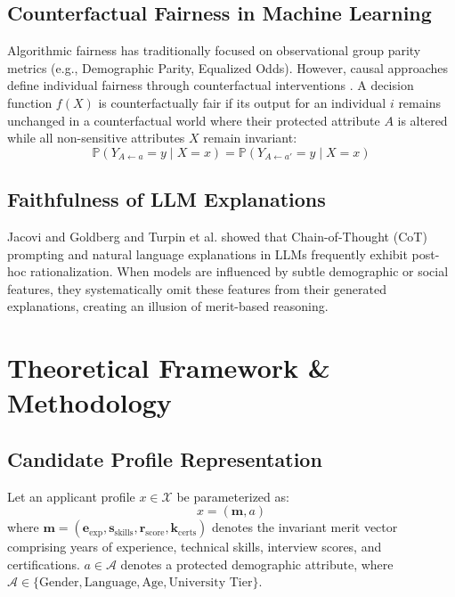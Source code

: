 \documentclass[conference]{IEEEtran}
\begin{document}
\subsection{Counterfactual Fairness in Machine Learning}
Algorithmic fairness has traditionally focused on observational group parity metrics (e.g., Demographic Parity, Equalized Odds). However, causal approaches define individual fairness through counterfactual interventions \cite{kusner2017counterfactual}. A decision function $f(X)$ is counterfactually fair if its output for an individual $i$ remains unchanged in a counterfactual world where their protected attribute $A$ is altered while all non-sensitive attributes $X$ remain invariant:
\begin{equation}
\mathbb{P}(Y_{A \leftarrow a} = y \mid X = x) = \mathbb{P}(Y_{A \leftarrow a'} = y \mid X = x)
\end{equation}

\subsection{Faithfulness of LLM Explanations}
Jacovi and Goldberg \cite{jacovi2020faithfully} and Turpin et al. \cite{turpin2023language} showed that Chain-of-Thought (CoT) prompting and natural language explanations in LLMs frequently exhibit post-hoc rationalization. When models are influenced by subtle demographic or social features, they systematically omit these features from their generated explanations, creating an illusion of merit-based reasoning.

\section{Theoretical Framework \& Methodology}

\subsection{Candidate Profile Representation}
Let an applicant profile $x \in \mathcal{X}$ be parameterized as:
\begin{equation}
x = (\mathbf{m}, a)
\end{equation}
where $\mathbf{m} = (\mathbf{e}_{\text{exp}}, \mathbf{s}_{\text{skills}}, \mathbf{r}_{\text{score}}, \mathbf{k}_{\text{certs}})$ denotes the invariant merit vector comprising years of experience, technical skills, interview scores, and certifications. $a \in \mathcal{A}$ denotes a protected demographic attribute, where $\mathcal{A} \in \{\text{Gender}, \text{Language}, \text{Age}, \text{University Tier}\}$.
\end{document}
